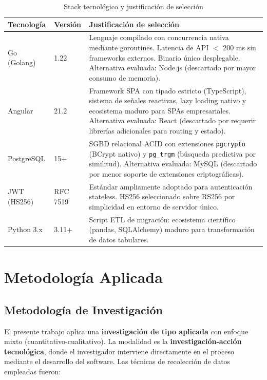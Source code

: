 \documentclass[12pt,a4paper,oneside]{report}
\begin{document}
\begin{table}[H]
\centering
\caption{Stack tecnológico y justificación de selección}
\begin{tabularx}{\textwidth}{|l|l|X|}
\hline
\rowcolor{lightgray}
\textbf{Tecnología} & \textbf{Versión} & \textbf{Justificación de selección} \\
\hline
Go (Golang) & 1.22 & Lenguaje compilado con concurrencia nativa mediante goroutines. Latencia de API $<$ 200 ms sin frameworks externos. Binario único desplegable. Alternativa evaluada: Node.js (descartado por mayor consumo de memoria). \\
\hline
Angular & 21.2 & Framework SPA con tipado estricto (TypeScript), sistema de señales reactivas, lazy loading nativo y ecosistema maduro para SPAs empresariales. Alternativa evaluada: React (descartado por requerir librerías adicionales para routing y estado). \\
\hline
PostgreSQL & 15+ & SGBD relacional ACID con extensiones \texttt{pgcrypto} (BCrypt nativo) y \texttt{pg\_trgm} (búsqueda predictiva por similitud). Alternativa evaluada: MySQL (descartado por menor soporte de extensiones criptográficas). \\
\hline
JWT (HS256) & RFC 7519 & Estándar ampliamente adoptado para autenticación stateless. HS256 seleccionado sobre RS256 por simplicidad en entorno de servidor único. \\
\hline
Python 3.x & 3.11+ & Script ETL de migración: ecosistema científico (pandas, SQLAlchemy) maduro para transformación de datos tabulares. \\
\hline
\end{tabularx}
\label{tab:tecnologias}
\end{table}

\chapter{Metodología Aplicada}

\section{Metodología de Investigación}

El presente trabajo aplica una \textbf{investigación de tipo aplicada} con enfoque mixto (cuantitativo-cualitativo). La modalidad es la \textbf{investigación-acción tecnológica}, donde el investigador interviene directamente en el proceso mediante el desarrollo del software. Las técnicas de recolección de datos empleadas fueron:
\end{document}
